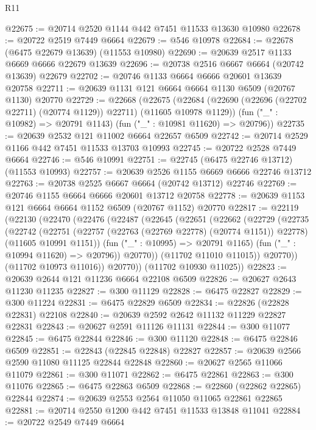 \begin{lexlean}{R11}
\begin{coremodule}
@22675 := @20714 @2520 @1144 @442 @7451 @11533 @13630 @10980
@22678 := @20722 @2519 @7449 @6664
@22679 := @546 @10978
@22684 := @22678 (@6475 @22679 @13639) (@11553 @10980)
@22690 := @20639 @2517 @1133 @6669 @6666 @22679 @13639
@22696 := @20738 @2516 @6667 @6664 (@20742 @13639) @22679
@22702 := @20746 @1133 @6664 @6666 @20601 @13639 @20758
@22711 := @20639 @1131 @121 @6664 @6664 @1130 @6509 (@20767 @1130) @20770
@22729 := @22668
    (@22675
      (@22684 (@22690 (@22696 (@22702 @22711) (@20774 @1129)) @22711) (@11605 @10978 @1129))
      (fun ("_" : @10982) => @20791 @1143)
      (fun ("_" : @10981 @11620) => @20796))
@22735 := @20639 @2532 @121 @11002 @6664 @22657 @6509
@22742 := @20714 @2529 @1166 @442 @7451 @11533 @13703 @10993
@22745 := @20722 @2528 @7449 @6664
@22746 := @546 @10991
@22751 := @22745 (@6475 @22746 @13712) (@11553 @10993)
@22757 := @20639 @2526 @1155 @6669 @6666 @22746 @13712
@22763 := @20738 @2525 @6667 @6664 (@20742 @13712) @22746
@22769 := @20746 @1155 @6664 @6666 @20601 @13712 @20758
@22778 := @20639 @1153 @121 @6664 @6664 @1152 @6509 (@20767 @1152) @20770
@22817 := @22119
    (@22130
      (@22470
        (@22476
          (@22487
            (@22645
              (@22651
                (@22662
                  (@22729
                    (@22735
                      (@22742
                        (@22751
                          (@22757 (@22763 (@22769 @22778) (@20774 @1151)) @22778)
                          (@11605 @10991 @1151))
                        (fun ("_" : @10995) => @20791 @1165)
                        (fun ("_" : @10994 @11620) => @20796))
                      @20770))
                  (@11702 @11010 @11015))
                @20770))
            (@11702 @10973 @11016))
          @20770))
      (@11702 @10930 @11025))
@22823 := @20639 @2644 @121 @11236 @6664 @22108 @6509
@22826 := @20627 @2643 @11230 @11235
@22827 := @300 @11129
@22828 := @6475 @22827
@22829 := @300 @11224
@22831 := @6475 @22829 @6509
@22834 := @22826 (@22828 @22831) @22108
@22840 := @20639 @2592 @2642 @11132 @11229 @22827 @22831
@22843 := @20627 @2591 @11126 @11131
@22844 := @300 @11077
@22845 := @6475 @22844
@22846 := @300 @11120
@22848 := @6475 @22846 @6509
@22851 := @22843 (@22845 @22848) @22827
@22857 := @20639 @2566 @2590 @11080 @11125 @22844 @22848
@22860 := @20627 @2565 @11066 @11079
@22861 := @300 @11071
@22862 := @6475 @22861
@22863 := @300 @11076
@22865 := @6475 @22863 @6509
@22868 := @22860 (@22862 @22865) @22844
@22874 := @20639 @2553 @2564 @11050 @11065 @22861 @22865
@22881 := @20714 @2550 @1200 @442 @7451 @11533 @13848 @11041
@22884 := @20722 @2549 @7449 @6664

\end{coremodule}
\end{lexlean}
